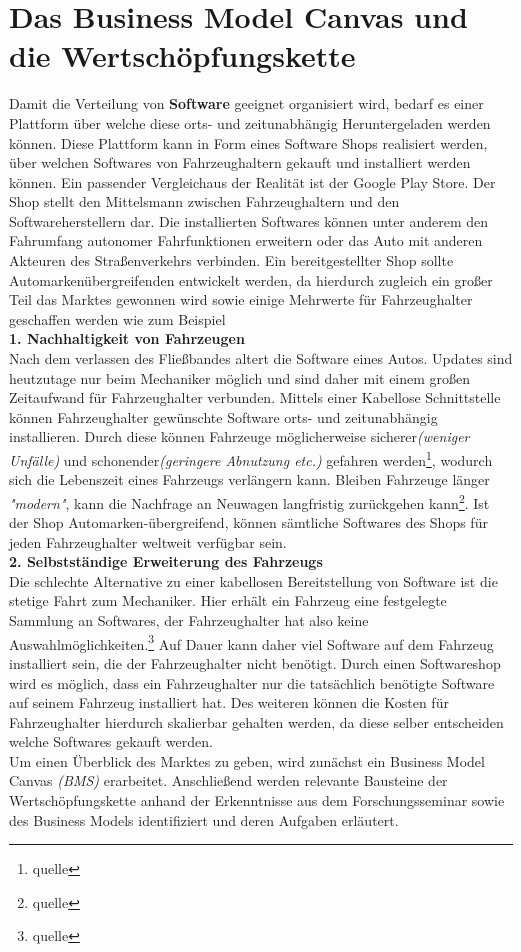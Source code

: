 \section{Das Business Model Canvas und die Wertschöpfungskette}\label{markt}
Damit die Verteilung von \textbf{Software} geeignet organisiert wird, bedarf es einer Plattform über welche diese orts- und zeitunabhängig Heruntergeladen werden können. Diese Plattform kann in Form eines Software Shops realisiert werden, über welchen Softwares von Fahrzeughaltern gekauft und installiert werden können. Ein passender Vergleichaus der Realität ist der Google Play Store. Der Shop stellt den Mittelsmann zwischen Fahrzeughaltern und den Softwareherstellern dar. Die installierten Softwares können unter anderem den Fahrumfang autonomer Fahrfunktionen erweitern oder das Auto mit anderen Akteuren des Straßenverkehrs verbinden. Ein bereitgestellter Shop sollte Automarkenübergreifenden entwickelt werden, da hierdurch zugleich ein großer Teil das Marktes gewonnen wird sowie einige Mehrwerte für Fahrzeughalter geschaffen werden wie zum Beispiel\\

\textbf{1. Nachhaltigkeit von Fahrzeugen}\\
Nach dem verlassen des Fließbandes altert die Software eines Autos. Updates sind heutzutage nur beim Mechaniker möglich und sind daher mit einem großen Zeitaufwand für Fahrzeughalter verbunden. Mittels einer Kabellose Schnittstelle können Fahrzeughalter gewünschte Software orts- und zeitunabhängig installieren. Durch diese können Fahrzeuge möglicherweise sicherer\textit{(weniger Unfälle)} und schonender\textit{(geringere Abnutzung etc.)} gefahren werden\footnote{quelle}, wodurch sich die Lebenszeit eines Fahrzeugs verlängern kann. Bleiben Fahrzeuge länger \textit{"modern"}, kann die Nachfrage an Neuwagen langfristig zurückgehen kann\footnote{quelle}. Ist der Shop Automarken-übergreifend, können sämtliche Softwares des Shops für jeden Fahrzeughalter weltweit verfügbar sein.\\


\textbf{2. Selbstständige Erweiterung des Fahrzeugs}\\
Die schlechte Alternative zu einer kabellosen Bereitstellung von Software ist die stetige Fahrt zum Mechaniker. Hier erhält ein Fahrzeug eine festgelegte Sammlung an Softwares, der Fahrzeughalter hat also keine Auswahlmöglichkeiten.\footnote{quelle} Auf Dauer kann daher viel Software auf dem Fahrzeug installiert sein, die der Fahrzeughalter nicht benötigt. Durch einen Softwareshop wird es möglich, dass ein Fahrzeughalter nur die tatsächlich benötigte Software auf seinem Fahrzeug installiert hat. Des weiteren können die Kosten für Fahrzeughalter hierdurch skalierbar gehalten werden, da diese selber entscheiden welche Softwares gekauft werden.\\

Um einen Überblick des Marktes zu geben, wird zunächst ein Business Model Canvas \textit{(BMS)} erarbeitet. Anschließend werden relevante Bausteine der Wertschöpfungskette anhand der Erkenntnisse aus dem Forschungsseminar sowie des Business Models identifiziert und deren Aufgaben erläutert.